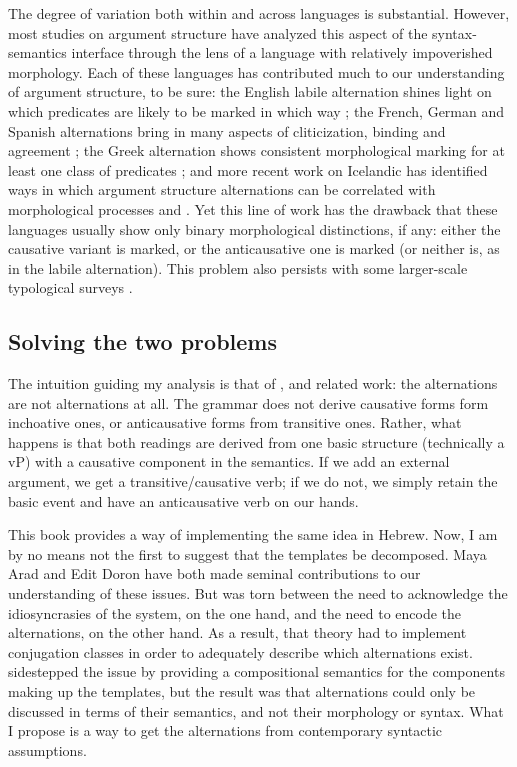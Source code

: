 The degree of variation both within and across languages is substantial. However, most studies on argument structure have analyzed this aspect of the syntax-semantics interface through the lens of a language with relatively impoverished morphology. Each of these languages has contributed much to our understanding of argument structure, to be sure: the English labile alternation shines light on which predicates are likely to be marked in which way \citep{haspelmath93,unaccusativity95,koontzgarboden09}; the French, German and Spanish alternations bring in many aspects of cliticization, binding and agreement \citep{labelle08,schaefer08,cuervo14}; the Greek alternation shows consistent morphological marking for at least one class of predicates \citep{alexiadoudoron12,layering15}; and more recent work on Icelandic has identified ways in which argument structure alternations can be correlated with morphological processes and \cite{wood14nllt,wood15springer}. Yet this line of work has the drawback that these languages usually show only binary morphological distinctions, if any: either the causative variant is marked, or the anticausative one is marked (or neither is, as in the labile alternation). This problem also persists with some larger-scale typological surveys \citep{haspelmath93,arad05}.

	\subsection{Solving the two problems}
The intuition guiding my analysis is that of \cite{schaefer08}, \cite{layering15} and related work: the alternations are not alternations at all. The grammar does not derive causative forms form inchoative ones, or anticausative forms from transitive ones. Rather, what happens is that both readings are derived from one basic structure (technically a vP) with a causative component in the semantics. If we add an external argument, we get a transitive/causative verb; if we do not, we simply retain the basic event and have an anticausative verb on our hands.

This book provides a way of implementing the same idea in Hebrew. Now, I am by no means not the first to suggest that the templates be decomposed. Maya Arad and Edit Doron have both made seminal contributions to our understanding of these issues. But \cite{arad05} was torn between the need to acknowledge the idiosyncrasies of the system, on the one hand, and the need to encode the alternations, on the other hand. As a result, that theory had to implement conjugation classes in order to adequately describe which alternations exist. \cite{doron03} sidestepped the issue by providing a compositional semantics for the components making up the templates, but the result was that alternations could only be discussed in terms of their semantics, and not their morphology or syntax. What I propose is a way to get the alternations from contemporary syntactic assumptions.

